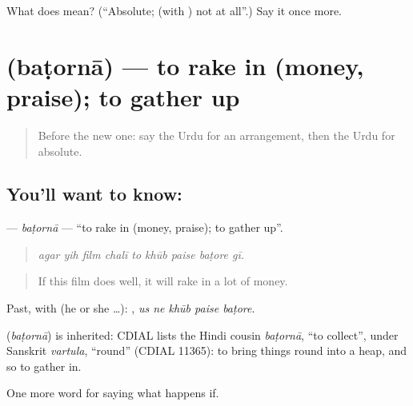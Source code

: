 \begin{tcolorbox}[breakable,colback=teal!4,colframe=teal!35!black,title={Before you move on}]
What does  mean? (\textquotedblleft{}Absolute; (with ) not at all\textquotedblright{}.) Say it once more.
\end{tcolorbox}
\section[\texorpdfstring{\ur{بٹورنا} (baṭornā)}{بٹورنا (baṭornā)}]{ (baṭornā) — to rake in (money, praise); to gather up}

\label{lesson:UR-C383-batorna}



\begin{quote}
Before the new one: say the Urdu for an arrangement, then the Urdu for absolute.
\end{quote}

\subsection*{You'll want to know: }
\textbf{} — \emph{baṭornā} — \textquotedblleft{}to rake in (money, praise); to gather up\textquotedblright{}.

\begin{quote}
        
\end{quote}

\begin{quote}
\emph{agar yih film chalī to khūb paise baṭore gī.}
\end{quote}

\begin{quote}
If this film does well, it will rake in a lot of money.
\end{quote}

Past, with  (he or she …):     , \emph{us ne khūb paise baṭore}.

\begin{cousinweb}
\textbf{} (\emph{baṭornā}) is inherited: CDIAL lists the Hindi cousin \emph{baṭornā}, \textquotedblleft{}to collect\textquotedblright{}, under Sanskrit \emph{vartula}, \textquotedblleft{}round\textquotedblright{} (CDIAL 11365): to bring things round into a heap, and so to gather in.
\end{cousinweb}

\begin{grammarlens}[title={What you've built}]
One more word for saying what happens if.
\end{grammarlens}

